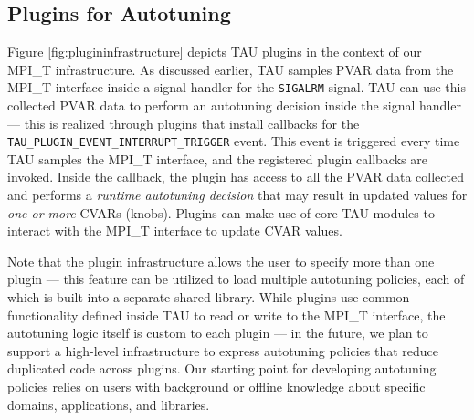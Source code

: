 \subsection{Plugins for Autotuning}
Figure \ref{fig:plugininfrastructure} depicts TAU plugins in the context of our MPI\_T infrastructure. As discussed earlier, TAU samples PVAR data from the MPI\_T interface inside a signal handler for the \verb+SIGALRM+ signal. TAU can use this collected PVAR data to perform an autotuning decision inside the signal handler --- this is realized through plugins that install callbacks for the \verb+TAU_PLUGIN_EVENT_INTERRUPT_TRIGGER+ event. This event is triggered every time TAU samples the MPI\_T interface, and the registered plugin callbacks are invoked. Inside the callback, the plugin has access to all the PVAR data collected and performs a \textit{runtime autotuning decision} that may result in updated values for \textit{one or more} CVARs (knobs). Plugins can make use of core TAU modules to interact with the MPI\_T interface to update CVAR values.
\par Note that the plugin infrastructure allows the user to specify more than one plugin --- this feature can be utilized to load multiple autotuning policies, each of which is built into a separate shared library. While plugins use common functionality defined inside TAU to read or write to the MPI\_T interface, the autotuning logic itself is custom to each plugin --- in the future, we plan to support a high-level infrastructure to express autotuning policies that reduce duplicated code across plugins. Our starting point for developing autotuning policies relies on users with background or offline knowledge about specific domains, applications, and libraries.

